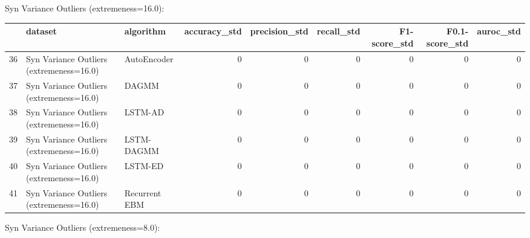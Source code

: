 Syn Variance Outliers (extremeness=16.0):

\begin{tabular}{rllrrrrrr}
\hline
    & dataset                                  & algorithm     &   accuracy\_std &   precision\_std &   recall\_std &   F1-score\_std &   F0.1-score\_std &   auroc\_std \\
\hline
 36 & Syn Variance Outliers (extremeness=16.0) & AutoEncoder   &              0 &               0 &            0 &              0 &                0 &           0 \\
 37 & Syn Variance Outliers (extremeness=16.0) & DAGMM         &              0 &               0 &            0 &              0 &                0 &           0 \\
 38 & Syn Variance Outliers (extremeness=16.0) & LSTM-AD       &              0 &               0 &            0 &              0 &                0 &           0 \\
 39 & Syn Variance Outliers (extremeness=16.0) & LSTM-DAGMM    &              0 &               0 &            0 &              0 &                0 &           0 \\
 40 & Syn Variance Outliers (extremeness=16.0) & LSTM-ED       &              0 &               0 &            0 &              0 &                0 &           0 \\
 41 & Syn Variance Outliers (extremeness=16.0) & Recurrent EBM &              0 &               0 &            0 &              0 &                0 &           0 \\
\hline
\end{tabular}

Syn Variance Outliers (extremeness=8.0):

